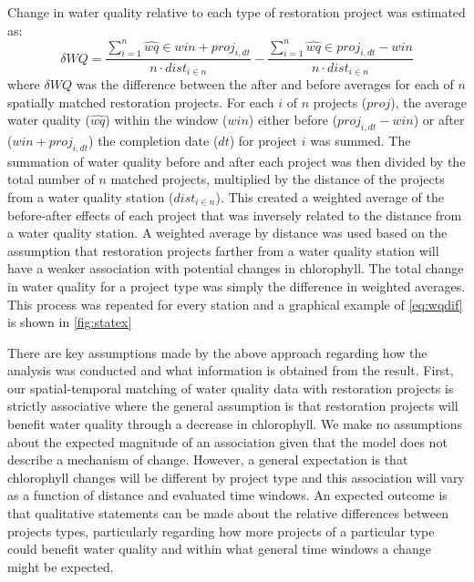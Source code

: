 \documentclass[]{article}
\begin{document}
Change in water quality relative to each type of restoration project was
estimated as: \begin{equation}
\delta WQ = \frac{\sum_{i = 1}^{n} \hat{wq} \in win + proj_{i, dt}}{n \cdot dist_{i \in n}} - \frac{\sum_{i = 1}^{n} \hat{wq} \in proj_{i, dt} - win}{n \cdot dist_{i \in n}}
\label{eq:wqdif}
\end{equation} where \(\delta WQ\) was the difference between the after
and before averages for each of \(n\) spatially matched restoration
projects. For each \(i\) of \(n\) projects (\(proj\)), the average water
quality (\(\hat{wq}\)) within the window (\(win\)) either before
(\(proj_{i, dt} - win\)) or after (\(win + proj_{i, dt}\)) the
completion date (\(dt\)) for project \(i\) was summed. The summation of
water quality before and after each project was then divided by the
total number of \(n\) matched projects, multiplied by the distance of
the projects from a water quality station (\(dist_{i \in n}\)). This
created a weighted average of the before-after effects of each project
that was inversely related to the distance from a water quality station.
A weighted average by distance was used based on the assumption that
restoration projects farther from a water quality station will have a
weaker association with potential changes in chlorophyll. The total
change in water quality for a project type was simply the difference in
weighted averages. This process was repeated for every station and a
graphical example of \cref{eq:wqdif} is shown in \cref{fig:statex}

There are key assumptions made by the above approach regarding how the
analysis was conducted and what information is obtained from the result.
First, our spatial-temporal matching of water quality data with
restoration projects is strictly associative where the general
assumption is that restoration projects will benefit water quality
through a decrease in chlorophyll. We make no assumptions about the
expected magnitude of an association given that the model does not
describe a mechanism of change. However, a general expectation is that
chlorophyll changes will be different by project type and this
association will vary as a function of distance and evaluated time
windows. An expected outcome is that qualitative statements can be made
about the relative differences between projects types, particularly
regarding how more projects of a particular type could benefit water
quality and within what general time windows a change might be expected.
\end{document}

